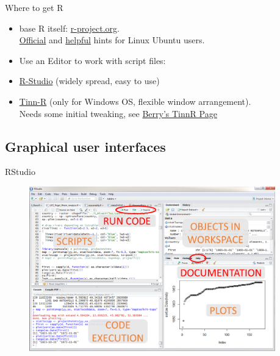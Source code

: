 \documentclass[xcolor=table,           xcolor=dvipsnames]{beamer}\usepackage[]{graphicx}\usepackage[]{color}
\begin{document}
\begin{frame}{Where to get R}
\begin{itemize}%
  \item base R itself: \href{https://cloud.r-project.org/}{r-project.org}.\\
        \href{https://cran.r-project.org/bin/linux/ubuntu/README.html}{Official} and \href{https://www.r-bloggers.com/how-to-install-r-on-linux-ubuntu-16-04-xenial-xerus/}{helpful} hints for Linux Ubuntu users.
  \item Use an Editor to work with script files:
  \item \href{https://www.rstudio.com/products/rstudio/\#Desktop}{R-Studio} (widely spread, easy to use)
  \item \href{http://sourceforge.net/projects/tinn-r/}{Tinn-R} (only for Windows OS, flexible window arrangement).\\
         Needs some initial tweaking, see \href{https://rclickhandbuch.wordpress.com/install-r/tinn-r_english}{Berry's TinnR Page} %
\end{itemize}
\label{installR}
\end{frame}

\subsection{Graphical user interfaces}



\begin{frame}{RStudio}
  \begin{figure}
  \includegraphics[width=0.95\textwidth]{./externalfig/Rstudio.png}
  \end{figure}
\end{frame}
\end{document}
